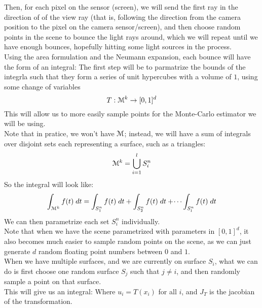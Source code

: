 \documentclass[12pt]{article}
\begin{document}
Then, for each pixel on the sensor (screen), we will
send the first ray in the direction of of the view ray
(that is, following the direction from the camera position
to the pixel on the camera sensor/screen), and then choose
random points in the scene to bounce the light rays
around, which we will repeat until we have
enough bounces, hopefully hitting some light sources in
the process. \\

Using the area formulation and the Neumann expansion, 
each bounce will have the form of an integral:
The first step will be to parmatrize the bounds of the
integrla such that they form a series of unit hypercubes
with a volume of $1$, using some change of variables
\[ T: \mathcal{M}^k \to [0, 1]^d \]
This will allow us to more easily sample points
for the Monte-Carlo estimator we will be using. \\

Note that in pratice, we won't have $\mathcal{M}$;
instead, we will have a sum of integrals 
over disjoint sets each
representing a surface, such as a triangles:
\[ \mathcal{M}^k = \bigcup_{i=1}^l S_i^n \]
So the integral will look like:
\[ \int_{\mathcal{M}^k} f(t)\;dt
= \int_{S_1^n} f(t)\;dt + \int_{S_2^n} f(t)\;dt +
\dots \int_{S_l^n} f(t)\;dt \]
We can then parametrize each set $S_i^n$ individually. \\

Note that when we have the scene parametrized
with parameters in $[0, 1]^d$, it also becomes
much easier to sample random points on the scene,
as we can just generate $d$ random floating point
numbers between $0$ and $1$. \\

When we have multiple surfaces,
and we are currently on surface $S_i$,
what we can do is first choose one random surface
$S_j$ such that $j \neq i$, and then randomly
sample a point on that surface. \\

This will give us an integral:
Where $u_i = T(x_i)$ for all $i$, and $J_T$
is the jacobian of the transformation. \\
\end{document}

